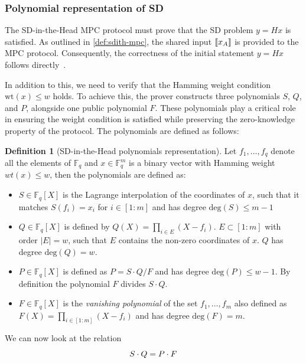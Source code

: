 \documentclass[11pt]{report}
\theoremstyle{definition}
\newtheorem{definition}{Definition}[section]
\theoremstyle{plain}
\begin{document}
\subsubsection{Polynomial representation of SD}\label{sec:polynomial_representation}

The SD-in-the-Head MPC protocol must prove that the SD problem $ y = Hx $ is satisfied. As outlined in \autoref{def:sdith-mpc}, the shared input $\llbracket x_A \rrbracket$ is provided to the MPC protocol. Consequently, the correctness of the initial statement $ y = Hx $ follows directly~\cite{feneuil2022syndrome}.

In addition to this, we need to verify that the Hamming weight condition $ \text{wt}(x) \leq w $ holds. To achieve this, the prover constructs three polynomials $ S $, $ Q $, and $ P $, alongside one public polynomial $ F $. These polynomials play a critical role in ensuring the weight condition is satisfied while preserving the zero-knowledge property of the protocol. The polynomials are defined as follows:

\begin{definition}[SD-in-the-Head polynomials representation]\label{def:sdith-polynomials}
  Let $f_1,\dots, f_q$ denote all the elements of $\mathbb{F}_q$ and $x\in \mathbb{F}^m_q$ is a binary vector with Hamming weight $wt(x) \leq w$, then the polynomials are defined as:
  \begin{itemize}
    \item $S\in \mathbb{F}_q[X]$ is the Lagrange interpolation of the coordinates of $x$, such that it matches $S(f_i) = x_i$ for $i\in [1:m]$ and has degree $\text{deg}(S) \leq m-1$
    \item $Q\in \mathbb{F}_q[X]$ is defined by $Q(X) = \prod_{i\in E}(X - f_i)$. $E \subset [1:m]$ with order $|E| = w$, such that $E$ contains the non-zero coordinates of $x$. $Q$ has degree $\text{deg}(Q) = w$.
    \item $P\in \mathbb{F}_q[X]$ is defined as $P = S\cdot Q/F$ and has degree $\text{deg}(P) \leq w-1$. By definition the polynomial $F$ divides $S\cdot Q$.
    \item $F\in \mathbb{F}_q[X]$ is the \textit{vanishing polynomial} of the set ${f_1, \dots, f_m}$ also defined as $F(X) = \prod_{i\in [1:m]}(X - f_i)$ and has degree $\text{deg}(F) = m$.
  \end{itemize}
\end{definition}

We can now look at the relation
\begin{equation}
  \centering
  S\cdot Q = P\cdot F\label{eq:polynomial_representation}
\end{equation}
\end{document}
